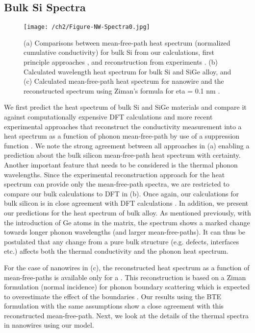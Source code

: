 \subsection{Bulk Si Spectra}
\begin{figure}[hbt]
  \centering \texttt{[image: /ch2/Figure-NW-Spectra0.jpg]}
  \caption{(a) Comparisons between mean-free-path heat spectrum (normalized cumulative conductivity) for bulk Si from our calculations, first principle approaches \cite{stokes_bulkSi_tau}, and reconstruction from experiments \cite{RN273,RN129,RN217}. (b) Calculated wavelength heat spectrum for bulk Si and SiGe alloy, and (c) Calculated mean-free-path heat spectrum for  nanowire and the reconstructed spectrum using Ziman’s formula for \gls{eta} = 0.1 nm \cite{RN129}.}
  \label{fig:ch2-nw-spectra-0}
\end{figure}
\par We first predict the heat spectrum of bulk Si and SiGe materials and compare it against computationally expensive DFT calculations \cite{stokes_bulkSi_tau} and more recent experimental approaches that reconstruct the conductivity measurement into a heat spectrum as a function of phonon mean-free-path by use of a suppression function \cite{RN273,RN129,RN217}. We note the strong agreement between all approaches in (a) enabling a prediction about the bulk silicon mean-free-path heat spectrum with certainty. Another important feature that needs to be considered is the thermal phonon wavelengths. Since the experimental reconstruction approach for the heat spectrum can provide only the mean-free-path spectra, we are restricted to compare our bulk calculations to DFT in (b). Once again, our calculations for bulk silicon is in close agreement with DFT calculations \cite{stokes_bulkSi_tau}. In addition, we present our predictions for the heat spectrum of bulk  alloy. As mentioned previously, with the introduction of Ge atoms in the matrix, the spectrum shows a marked change towards longer phonon wavelengths (and larger mean-free-paths). It can thus be postulated that any change from a pure bulk structure (e.g. defects, interfaces etc.) affects both the thermal conductivity and the phonon heat spectrum. 
\par For the case of nanowires in (c), the reconstructed heat spectrum as a function of mean-free-paths is available only for a  \cite{RN129}. This reconstruction is based on a Ziman formulation (normal incidence) for phonon boundary scattering which is expected to overestimate the effect of the boundaries \cite{ownNW}. Our results using the BTE formulation with the same assumptions show a close agreement with this reconstructed mean-free-path. Next, we look at the details of the thermal spectra in nanowires using our model.
